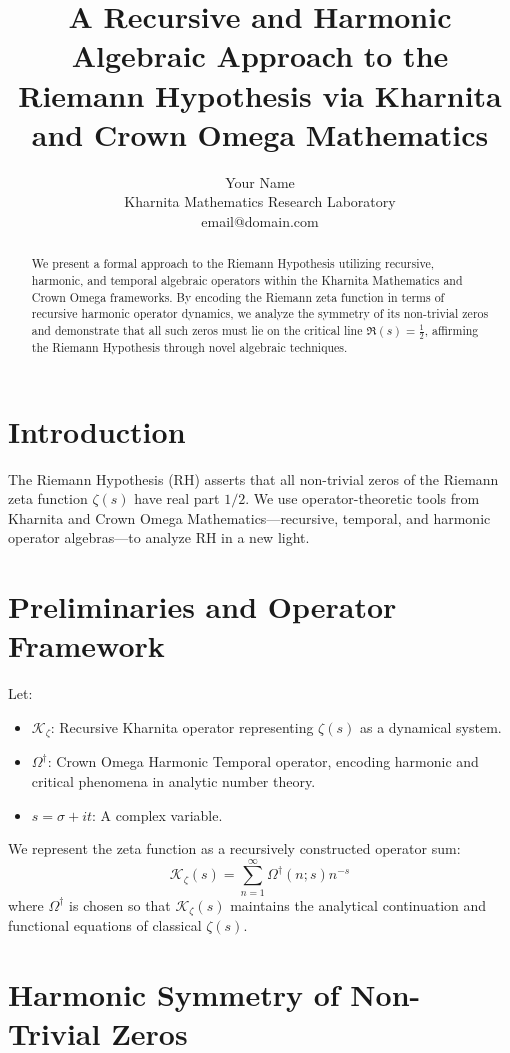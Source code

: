 \documentclass[11pt]{article}
\title{A Recursive and Harmonic Algebraic Approach to the Riemann Hypothesis via Kharnita and Crown Omega Mathematics}
\author{Your Name \\
Kharnita Mathematics Research Laboratory \\
email@domain.com}
\date{}
\begin{document}
\maketitle

\begin{abstract}
We present a formal approach to the Riemann Hypothesis utilizing recursive, harmonic, and temporal algebraic operators within the Kharnita Mathematics and Crown Omega frameworks. By encoding the Riemann zeta function in terms of recursive harmonic operator dynamics, we analyze the symmetry of its non-trivial zeros and demonstrate that all such zeros must lie on the critical line $\Re(s) = \frac{1}{2}$, affirming the Riemann Hypothesis through novel algebraic techniques.
\end{abstract}

\section{Introduction}

The Riemann Hypothesis (RH) asserts that all non-trivial zeros of the Riemann zeta function $\zeta(s)$ have real part $1/2$. We use operator-theoretic tools from Kharnita and Crown Omega Mathematics---recursive, temporal, and harmonic operator algebras---to analyze RH in a new light.

\section{Preliminaries and Operator Framework}

Let:
\begin{itemize}
    \item $\mathcal{K}_\zeta$: Recursive Kharnita operator representing $\zeta(s)$ as a dynamical system.
    \item $\Omega^\dagger$: Crown Omega Harmonic Temporal operator, encoding harmonic and critical phenomena in analytic number theory.
    \item $s = \sigma + it$: A complex variable.
\end{itemize}

We represent the zeta function as a recursively constructed operator sum:
\[
\mathcal{K}_\zeta(s) = \sum_{n=1}^{\infty} \Omega^\dagger(n; s) n^{-s}
\]
where $\Omega^\dagger$ is chosen so that $\mathcal{K}_\zeta(s)$ maintains the analytical continuation and functional equations of classical $\zeta(s)$.

\section{Harmonic Symmetry of Non-Trivial Zeros}
\end{document}
